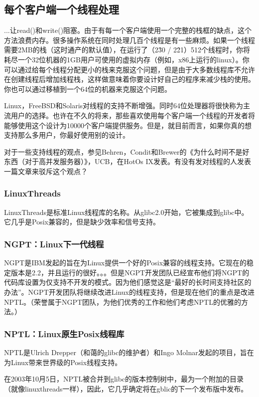 \documentclass[twoside, xetex]{report}
\begin{document}
\subsection*{每个客户端一个线程处理}
	
	...让read()和write()阻塞。由于有每一个客户端使用一个完整的栈框的缺点，这个方法浪费内存。很多操作系统在同时处理几百个线程是有一些麻烦。如果一个线程需要2MB的栈（这时通产的默认值），在运行了（2\^30 / 2\^21）512个线程时，你将耗尽一个32位机器的1GB用户可使用的虚拟内存（例如，x86上运行的linux）。你可以通过给每个线程分配更小的栈来克服这个问题，但是由于大多数线程库不允许在创建线程后增加线程栈，这样做意味着你要设计好自己的程序来减少栈的使用。你也可以通过移植到一个64位的机器来克服这个问题。

	Linux，FreeBSD和Solaris对线程的支持不断增强。同时64位处理器将很快称为主流用户的选择。也许在不久的将来，那些喜欢使用每个客户端一个线程的开发者将能够使用这个设计为10000个客户端提供服务。但是，就目前而言，如果你真的想支持那么多用户，你最好使用别的设计。

	对于一些支持线程的观点，参见Behren，Condit和Brewer的《为什么时间不是好东西（对于高并发服务器）》，UCB，在HotOs IX发表。有没有发对线程的人发表一篇文章来驳斥这个观点？

\subsubsection*{LinuxThreads}
	LinuxThreads是标准Linux线程库的名称。从glibc2.0开始，它被集成到glibc中。它几乎是Posix兼容的，但是缺少效率和信号支持。

\subsubsection*{NGPT：Linux下一代线程}
	NGPT是IBM发起的旨在为Linux提供一个好的Posix兼容的线程支持。它现在的稳定版本是2.2，并且运行的很好。。。但是NGPT开发团队已经宣布他们将NGPT的代码库设置为仅支持不开发的模式。因为他们感觉这是“最好的长时间支持社区的办法”。NGPT开发团队将继续改进Linux的线程支持，但是现在他们的重点是改进NPTL。（荣誉属于NGPT团队，为他们优秀的工作和他们考虑NPTL的优雅的方法。）

\subsubsection*{NPTL：Linux原生Posix线程库}
	NPTL是Ulrich Drepper（和蔼的glibc的维护者）和Ingo Molnar发起的项目，旨在为Linux带来世界级的Posix线程支持。

	在2003年10月5日，NPTL被合并到glibc的版本控制树中，最为一个附加的目录（就像linuxthreads一样），因此，它几乎确定将在gblic的下一个发布版中发布。
\end{document}
